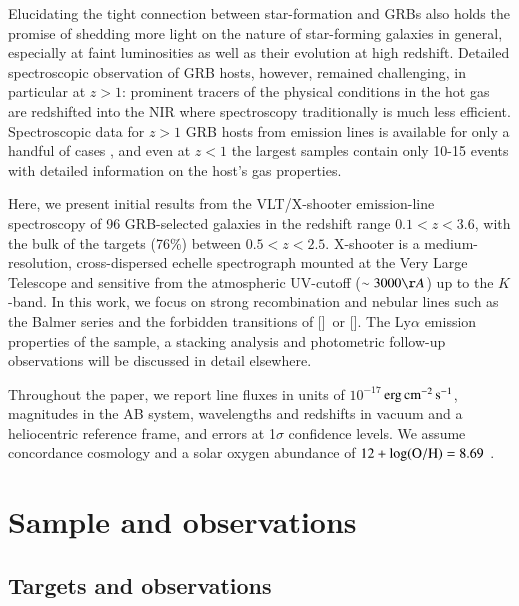 \documentclass[traditabstract, longauth]{aa}
\newcommand{\erg}{$\rm{erg\,cm^{-2}\,s^{-1}}$}
\newcommand{\oh}{12+\log(\rm{O/H})}
\newcommand{\oii}{[\ion{O}{ii}]}
\newcommand{\oiii}{[\ion{O}{iii}]}
\begin{document}
Elucidating the tight connection between star-formation and GRBs also holds the promise of shedding more light on the nature of star-forming galaxies in general, especially at faint luminosities as well as their evolution at high redshift. Detailed spectroscopic observation of GRB hosts, however, remained challenging, in particular at $z>1$: prominent tracers of the physical conditions in the hot gas are redshifted into the NIR where spectroscopy traditionally is much less efficient. Spectroscopic data for $z > 1$ GRB hosts from emission lines is available for only a handful of cases \citep[e.g.,][]{2012MNRAS.419.3039C, 2014arXiv1409.6315F, 2015Silviasubm}, and even at $z < 1$ the largest samples \citep{2009ApJ...691..182S, 2010AJ....139..694L, 2013ApJ...774..119G} contain only 10-15 events with detailed information on the host's gas properties.

Here, we present initial results from the VLT/X-shooter emission-line spectroscopy of 96 GRB-selected galaxies in the redshift range $0.1<z<3.6$, with the bulk of the targets (76\%) between $0.5<z<2.5$. X-shooter is a medium-resolution, cross-dispersed echelle spectrograph mounted at the Very Large Telescope \citep{2011A&A...536A.105V} and sensitive from the atmospheric UV-cutoff ($\sim 3000\AA$) up to the $K$-band. In this work, we focus on strong recombination and nebular lines such as the Balmer series and the forbidden transitions of \oii\, or \oiii. The Ly$\alpha$ emission properties of the sample, a stacking analysis and photometric follow-up observations will be discussed in detail elsewhere. 

Throughout the paper, we report line fluxes in units of $10^{-17}\,$\erg, magnitudes in the AB system, wavelengths and redshifts in vacuum and a heliocentric reference frame, and errors at 1$\sigma$ confidence levels. We assume concordance cosmology \citep[][$\Omega_{\rm{m}}=0.315$, $\Omega_\Lambda=0.685$, $H_0=67.3\,\rm{km}\,s^{-1}\, Mpc^{-1}$]{2014A&A...571A..16P} and a solar oxygen abundance of $\oh=8.69$ \citep{2009ARA&A..47..481A}.

\section{Sample and observations}


\subsection{Targets and observations}
\label{sec:tarob}
\end{document}
